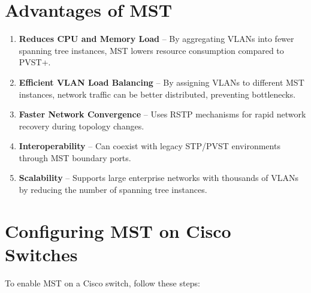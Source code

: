 \documentclass[a4paper]{book}
\begin{document}
\section*{Advantages of MST}
\begin{enumerate}
	\item \textbf{Reduces CPU and Memory Load} – By aggregating VLANs into fewer spanning tree instances, MST lowers resource consumption compared to PVST+.
	\item \textbf{Efficient VLAN Load Balancing} – By assigning VLANs to different MST instances, network traffic can be better distributed, preventing bottlenecks.
	\item \textbf{Faster Network Convergence} – Uses RSTP mechanisms for rapid network recovery during topology changes.
	\item \textbf{Interoperability} – Can coexist with legacy STP/PVST environments through MST boundary ports.
	\item \textbf{Scalability} – Supports large enterprise networks with thousands of VLANs by reducing the number of spanning tree instances.
\end{enumerate}

\section*{Configuring MST on Cisco Switches}
To enable MST on a Cisco switch, follow these steps:
\end{document}
